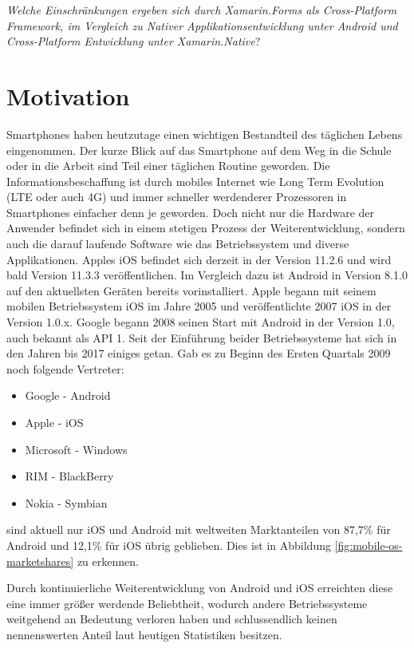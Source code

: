 	\textit{Welche Einschränkungen ergeben sich durch Xamarin.Forms als Cross-Platform Framework, im Vergleich zu Nativer Applikationsentwicklung unter Android und Cross-Platform Entwicklung unter Xamarin.Native}?

\section{Motivation}
\label{sec:motivation}

	Smartphones haben heutzutage einen wichtigen Bestandteil des täglichen Lebens eingenommen. Der kurze Blick auf das Smartphone auf dem Weg in die Schule oder in die Arbeit sind Teil einer täglichen Routine geworden. Die Informationsbeschaffung ist durch mobiles Internet wie Long Term Evolution (LTE oder auch 4G) und immer schneller werdenderer Prozessoren in Smartphones einfacher denn je geworden. Doch nicht nur die Hardware der Anwender befindet sich in einem stetigen Prozess der Weiterentwicklung, sondern auch die darauf laufende Software wie das Betriebssystem und diverse Applikationen. Apples iOS befindet sich derzeit in der Version 11.2.6 und wird bald Version 11.3.3 veröffentlichen. Im Vergleich dazu ist Android in Version 8.1.0 auf den aktuellsten Geräten bereits vorinstalliert. Apple begann mit seinem mobilen Betriebssystem iOS im Jahre 2005 und veröffentlichte 2007 iOS in der Version 1.0.x. Google begann 2008 seinen Start mit Android in der Version 1.0, auch bekannt als API 1. Seit der Einführung beider Betriebssysteme hat sich in den Jahren bis 2017 einiges getan. Gab es zu Beginn des Ersten Quartals 2009 noch folgende Vertreter:
	\begin{itemize}
		\setlength\itemsep{0em}
		\item Google - Android
		\item Apple - iOS
		\item Microsoft - Windows
		\item RIM - BlackBerry
		\item Nokia - Symbian
	\end{itemize}

	sind aktuell nur iOS und Android mit weltweiten Marktanteilen von 87,7\% für Android und 12,1\% für iOS übrig geblieben. Dies ist in Abbildung \ref{fig:mobile-os-marketshares} zu erkennen.

	Durch kontinuierliche Weiterentwicklung von Android und iOS erreichten diese eine immer größer werdende Beliebtheit, wodurch andere Betriebssysteme weitgehend an Bedeutung verloren haben und schlussendlich keinen nennenswerten Anteil laut heutigen Statistiken besitzen.

